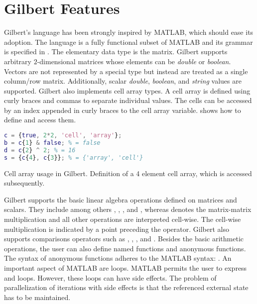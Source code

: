 \section{Gilbert Features}
\label{sec:gilbertFeatures}

Gilbert's language has been strongly inspired by MATLAB, which should ease its adoption.
The language is a fully functional subset of MATLAB and its grammar is specified in \cite{Rohrmann2014}.
The elementary data type is the matrix. 
Gilbert supports arbitrary $2$-dimensional matrices whose elements can be \emph{double} or \emph{boolean}.
Vectors are not represented by a special type but instead are treated as a single column/row matrix.
Additionally, scalar \emph{double}, \emph{boolean}, and \emph{string} values are supported. 
Gilbert also implements cell array types.
A cell array is defined using curly braces and commas to separate individual values. 
The cells can be accessed by an index appended in curly braces to the cell array variable. 
 shows how to define and access them.
\begin{listing}[!h]
    \begin{lstlisting}[language=Matlab,
        commentstyle=\color{black},
        stringstyle=\color{black},
        xleftmargin=.2\textwidth,
        basicstyle=\footnotesize
    ]
c = {true, 2*2, 'cell', 'array'};
b = c{1} & false; % = false
d = c{2} ^ 2; % = 16
s = {c{4}, c{3}}; % = {'array', 'cell'} 
    \end{lstlisting}
  \caption{Cell array usage in Gilbert. Definition of a 4 element cell array, which is accessed subsequently.}
  \label{lst:cellArray}
\end{listing}
Gilbert supports the basic linear algebra operations defined on matrices and scalars. 
They include among others \code{+}, \code{-}, \code{/}, and \code{*}, whereas \code{*} denotes the matrix-matrix multiplication and all other operations are interpreted cell-wise. 
The cell-wise multiplication is indicated by a point preceding the operator. 
Gilbert also supports comparisons operators such as \code{>}, \code{>=}, \code{==}, and \code{\textasciitilde=}. 
Besides the basic arithmetic operations, the user can also define named functions and anonymous functions. 
The syntax of anonymous functions adheres to the MATLAB syntax: . 
An important aspect of MATLAB are loops. 
MATLAB permits the user to express  and  loops. 
However, these loops can have side effects. 
The problem of parallelization of iterations with side effects is that the referenced external state has to be maintained. 
